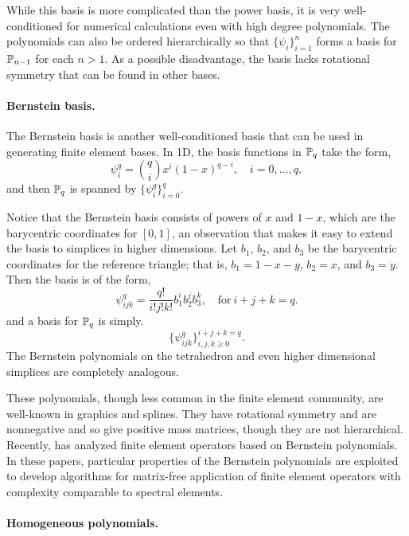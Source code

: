 While this basis is more complicated than the power basis, it is very
well-conditioned for numerical calculations even with high degree
polynomials.  The polynomials can also be ordered hierarchically so
that
\( \{ \psi_i \}_{i=1}^{n} \) forms a basis for $\P_{n-1}$ 
for each \( n > 1 \).  As a possible disadvantage, the
basis lacks rotational symmetry that can be found in  other bases.

\paragraph{Bernstein basis.}
The Bernstein basis is another well-conditioned basis that can be
used in generating finite element bases.
In 1D, the  basis functions in $\P_q$ take the form,
\begin{equation}
\psi_i^q = \binom{q}{i} x^i (1-x)^{q-i}, \quad i=0,\ldots,q,
\end{equation}
and then \( \P_q \) is spanned by \( \{ \psi_i^q \}_{i=0}^q \).

Notice that the Bernstein basis consists of powers of \( x \) and \( 1-x \),  which are the
barycentric coordinates for \( [0,1] \), an observation that makes it
easy to extend the basis to simplices in higher dimensions.
Let $b_1$, $b_2$, and $b_3$ be the barycentric coordinates for
the reference triangle; that is,
$b_1=1-x-y$, $b_2=x$, and $b_3=y$. Then the basis is
of the form,
\begin{equation}
\psi_{ijk}^q = \frac{q!}{i!j!k!} b_1^i b_2^j b_3^k, \quad  \mbox{for} \ i+j+k=q .
\end{equation}
and a basis for $\P_q$ is simply.
\begin{equation}
\{ \psi_{ijk}^q \}_{i,j,k\geq 0}^{i+j+k = q} .
\end{equation}
The Bernstein polynomials on the tetrahedron and even higher
dimensional simplices are completely analogous.

These polynomials, though less common in the finite element community,
are well-known in graphics and splines.  They have 
rotational symmetry and are nonnegative and so give positive
mass matrices, though they are not hierarchical.
Recently, \citet{Kirby2009,Kirby2010} has analyzed finite element operators based on Bernstein
polynomials.  In these papers, particular properties of the Bernstein
polynomials are exploited to develop algorithms for matrix-free
application of finite element operators with complexity comparable to
spectral elements.


\paragraph{Homogeneous polynomials.}
\label{sec:homo:pol}

